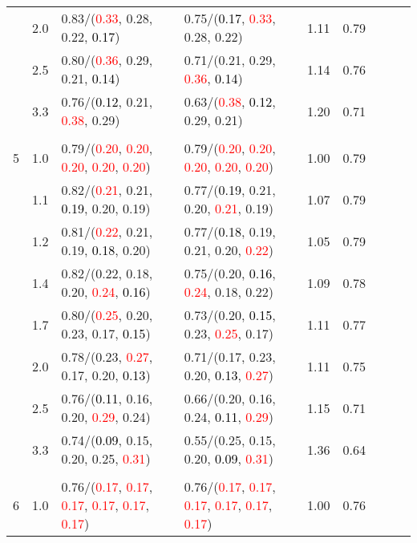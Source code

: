 \documentclass[10pt,a4paper]{report}
\begin{document}
\begin{table}[!htbp]
\begin{center}
{\begin{tabular}{ccllccccc}
			&2.0&0.83/(\textcolor{red}{0.33}, 0.28, 0.22, \textcolor{black}{0.17})&0.75/(\textcolor{black}{0.17}, \textcolor{red}{0.33}, 0.28, 0.22)&1.11&0.79\\
			&2.5&0.80/(\textcolor{red}{0.36}, 0.29, 0.21, \textcolor{black}{0.14})&0.71/(0.21, 0.29, \textcolor{red}{0.36}, \textcolor{black}{0.14})&1.14&0.76\\
			&3.3&0.76/(\textcolor{black}{0.12}, 0.21, \textcolor{red}{0.38}, 0.29)&0.63/(\textcolor{red}{0.38}, \textcolor{black}{0.12}, 0.29, 0.21)&1.20&0.71\\
			&&&&\\
			5			&1.0&0.79/(\textcolor{red}{0.20}, \textcolor{red}{0.20}, \textcolor{red}{0.20}, \textcolor{red}{0.20}, \textcolor{red}{0.20})&0.79/(\textcolor{red}{0.20}, \textcolor{red}{0.20}, \textcolor{red}{0.20}, \textcolor{red}{0.20}, \textcolor{red}{0.20})&1.00&0.79\\
			&1.1&0.82/(\textcolor{red}{0.21}, 0.21, \textcolor{black}{0.19}, 0.20, 0.19)&0.77/(\textcolor{black}{0.19}, 0.21, 0.20, \textcolor{red}{0.21}, 0.19)&1.07&0.79\\
			&1.2&0.81/(\textcolor{red}{0.22}, 0.21, 0.19, \textcolor{black}{0.18}, 0.20)&0.77/(\textcolor{black}{0.18}, 0.19, 0.21, 0.20, \textcolor{red}{0.22})&1.05&0.79\\
			&1.4&0.82/(0.22, 0.18, 0.20, \textcolor{red}{0.24}, \textcolor{black}{0.16})&0.75/(0.20, \textcolor{black}{0.16}, \textcolor{red}{0.24}, 0.18, 0.22)&1.09&0.78\\
			&1.7&0.80/(\textcolor{red}{0.25}, 0.20, 0.23, 0.17, \textcolor{black}{0.15})&0.73/(0.20, \textcolor{black}{0.15}, 0.23, \textcolor{red}{0.25}, 0.17)&1.11&0.77\\
			&2.0&0.78/(0.23, \textcolor{red}{0.27}, 0.17, 0.20, \textcolor{black}{0.13})&0.71/(0.17, 0.23, 0.20, \textcolor{black}{0.13}, \textcolor{red}{0.27})&1.11&0.75\\
			&2.5&0.76/(\textcolor{black}{0.11}, 0.16, 0.20, \textcolor{red}{0.29}, 0.24)&0.66/(0.20, 0.16, 0.24, \textcolor{black}{0.11}, \textcolor{red}{0.29})&1.15&0.71\\
			&3.3&0.74/(\textcolor{black}{0.09}, 0.15, 0.20, 0.25, \textcolor{red}{0.31})&0.55/(0.25, 0.15, 0.20, \textcolor{black}{0.09}, \textcolor{red}{0.31})&1.36&0.64\\
			&&&&\\
			6			&1.0&0.76/(\textcolor{red}{0.17}, \textcolor{red}{0.17}, \textcolor{red}{0.17}, \textcolor{red}{0.17}, \textcolor{red}{0.17}, \textcolor{red}{0.17})&0.76/(\textcolor{red}{0.17}, \textcolor{red}{0.17}, \textcolor{red}{0.17}, \textcolor{red}{0.17}, \textcolor{red}{0.17}, \textcolor{red}{0.17})&1.00&0.76\\

\end{tabular}}
\end{center}
\end{table}
\end{document}
